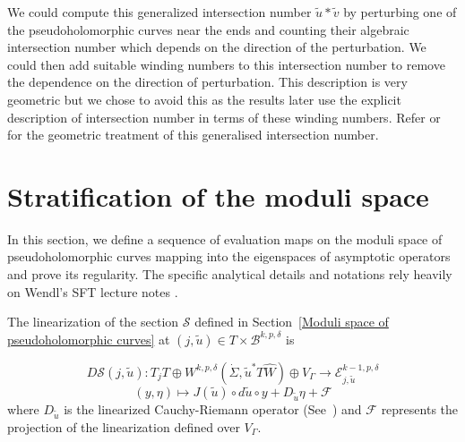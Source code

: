 \documentclass[11pt, a4paper]{amsart}
\newcommand{\cB}{\mathcal{B}}
\newcommand{\cE}{\mathcal{E}}
\newcommand{\cF}{\mathcal{F}}
\newcommand{\cS}{\mathcal{S}}
\begin{document}
\begin{remark}\label{rem:GeometricDecrpition}
We could compute this generalized intersection number $\tilde{u}*\tilde{v}$ by perturbing one of the pseudoholomorphic curves near the ends and counting their algebraic intersection number which depends on the direction of the perturbation. We could then add suitable winding numbers to this intersection number to remove the dependence on the direction of perturbation. This description is very geometric but we chose to avoid this as the results later use the explicit description of intersection number in terms of these winding numbers. Refer \cite[Chapter~4]{Wendlcontact3mani2020} or \cite[Section~3.2]{Siefinter2009} for the geometric treatment of this generalised intersection number.
\end{remark}


\section{Stratification of the moduli space} \label{section: Stratification of the moduli space} In this section, we define a sequence of evaluation maps on the moduli space of pseudoholomorphic curves mapping into the eigenspaces of asymptotic operators and prove its regularity. The specific analytical details and notations rely heavily on Wendl's SFT lecture notes \cite{SFTwendl}.\\
\vspace{1pt}

The linearization of the section $\cS$ defined in Section~\ref{Moduli space of pseudoholomorphic curves} at $(j,\tilde{u})\in T \times \cB^{k,p,\delta}$ is

$$D\cS(j,\tilde{u})\colon T_{j} T \oplus W^{k,p,\delta}(\dot{\Sigma},\tilde{u}^*T\widehat{W}) \oplus V_{\Gamma} \rightarrow \cE_{j,\tilde{u}}^{k-1,p,\delta}$$
$$(y,\eta) \mapsto J(\tilde{u})\circ d\tilde{u} \circ y + D_{\tilde{u}} \eta + \cF $$
where $D_{\tilde{u}}$ is the linearized Cauchy-Riemann operator (See~\cite[Section~2.1]{SFTwendl}) and $\cF$ represents the projection of the linearization defined over $V_{\Gamma}$.\\
\end{document}

